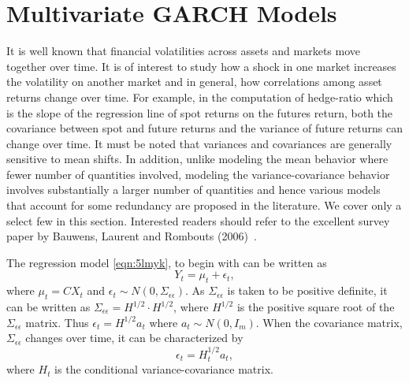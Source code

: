 \section{Multivariate GARCH Models}


It is well known that financial volatilities across assets and markets move together over time. It is of interest to study how a shock in one market increases the volatility on another market and in general, how correlations among asset returns change over time. For example, in the computation of hedge-ratio which is the slope of the regression line of spot returns on the futures return, both the covariance between spot and future returns and the variance of future returns can change over time. It must be noted that variances and covariances are generally sensitive to mean shifts. In addition, unlike modeling the mean behavior where fewer number of quantities involved, modeling the variance-covariance behavior involves substantially a larger number of quantities and hence various models that account for some redundancy are proposed in the literature. We cover only a select few in this section. Interested readers should refer to the excellent survey paper by Bauwens, Laurent and Rombouts (2006)~\cite{laurent}.


The regression model \eqref{eqn:5lmyk}, to begin with can be written as
	\begin{equation} \label{eqn:3relabel}
	Y_t= \mu_t+\epsilon_t,
	\end{equation}
where $\mu_t=CX_t$ and $\epsilon_t \sim N(0,\Sigma_{\epsilon\epsilon})$. As $\Sigma_{\epsilon\epsilon}$ is taken to be positive definite, it can be written as $\Sigma_{\epsilon\epsilon}= H^{1/2} \cdot H^{1/2}$, where $H^{1/2}$ is the positive square root of the $\Sigma_{\epsilon\epsilon}$ matrix. Thus $\epsilon_t= H^{1/2} a_t$ where $a_t \sim N(0,I_m)$. When the covariance matrix, $\Sigma_{\epsilon\epsilon}$ changes over time, it can be characterized by
	\begin{equation}
	\epsilon_t=H^{1/2}_t a_t,
	\end{equation}
where $H_t$ is the conditional variance-covariance matrix.


